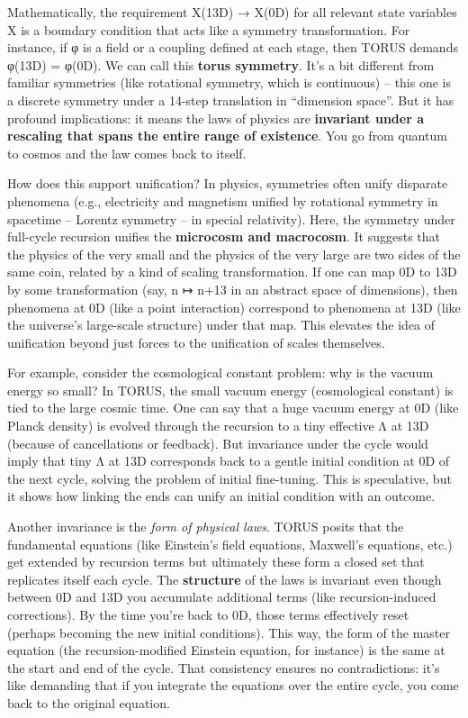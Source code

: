 Mathematically, the requirement X(13D) → X(0D) for all relevant state
variables X is a boundary condition that acts like a symmetry
transformation​. For instance, if φ is a field or a coupling defined at
each stage, then TORUS demands φ(13D) = φ(0D). We can call this
\textbf{torus symmetry}. It's a bit different from familiar symmetries
(like rotational symmetry, which is continuous) -- this one is a
discrete symmetry under a 14-step translation in ``dimension space''.
But it has profound implications: it means the laws of physics are
\textbf{invariant under a rescaling that spans the entire range of
existence}. You go from quantum to cosmos and the law comes back to
itself.

How does this support unification? In physics, symmetries often unify
disparate phenomena (e.g., electricity and magnetism unified by
rotational symmetry in spacetime -- Lorentz symmetry -- in special
relativity). Here, the symmetry under full-cycle recursion unifies the
\textbf{microcosm and macrocosm}. It suggests that the physics of the
very small and the physics of the very large are two sides of the same
coin, related by a kind of scaling transformation. If one can map 0D to
13D by some transformation (say, n ↦ n+13 in an abstract space of
dimensions), then phenomena at 0D (like a point interaction) correspond
to phenomena at 13D (like the universe's large-scale structure) under
that map. This elevates the idea of unification beyond just forces to
the unification of scales themselves.

For example, consider the cosmological constant problem: why is the
vacuum energy so small? In TORUS, the small vacuum energy (cosmological
constant) is tied to the large cosmic time. One can say that a huge
vacuum energy at 0D (like Planck density) is evolved through the
recursion to a tiny effective Λ at 13D (because of cancellations or
feedback). But invariance under the cycle would imply that tiny Λ at 13D
corresponds back to a gentle initial condition at 0D of the next cycle,
solving the problem of initial fine-tuning. This is speculative, but it
shows how linking the ends can unify an initial condition with an
outcome.

Another invariance is the \emph{form of physical laws}. TORUS posits
that the fundamental equations (like Einstein's field equations,
Maxwell's equations, etc.) get extended by recursion terms but
ultimately these form a closed set that replicates itself each cycle.
The \textbf{structure} of the laws is invariant even though between 0D
and 13D you accumulate additional terms (like recursion-induced
corrections). By the time you're back to 0D, those terms effectively
reset (perhaps becoming the new initial conditions). This way, the form
of the master equation (the recursion-modified Einstein equation, for
instance) is the same at the start and end of the cycle​. That
consistency ensures no contradictions: it's like demanding that if you
integrate the equations over the entire cycle, you come back to the
original equation.

